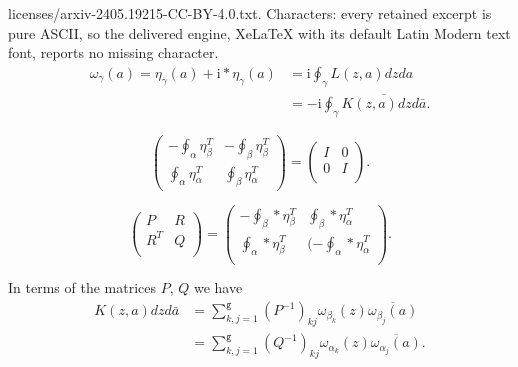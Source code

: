 \documentclass[10pt,a4paper]{amsart}
\def\I{\mathrm{i}}
\begin{document}
licenses/arxiv-2405.19215-CC-BY-4.0.txt. Characters: every retained excerpt is pure ASCII, so the delivered engine, XeLaTeX with its default Latin Modern text font, reports no missing character.
\begin{align}\label{omegaeta}
\omega_\gamma(a)=\eta_\gamma(a)+\I*\eta_\gamma(a)
&=\I \oint_\gamma L(z,a)dzda\\ 
&=-\I \oint_\gamma \overline{K(z,a)dzd\bar{a}}.
\end{align}

\begin{equation}\label{periods}
\left( \begin{array}{cc}
-\oint_{\alpha} \eta_{\beta}^T& -\oint_{\beta} \eta_{\beta}^T\\
\oint_{\alpha} \eta_{\alpha}^T & \oint_{\beta} \eta_{\alpha}^T 
\end{array} \right)
=\left( \begin{array}{cc}
                                            I & 0  \\
                                             0 & I  \\
\end{array} \right).
\end{equation}

\begin{equation}\label{PRRQ}
\left( \begin{array}{cc}
                                            P & R  \\
                                              R^T & Q  \\
\end{array} \right)=
\left( \begin{array}{cc} 
                                             - \oint_{\beta}*\eta_{\beta}^T & \oint_{\beta}*\eta_{\alpha}^T  \\
                                               \oint_{\alpha}*\eta_{\beta}^T & ( -\oint_{\alpha}*\eta_{\alpha}^T  \\
\end{array} \right).
\end{equation}

\begin{proposition}\label{prop:GUU} 
In terms of the matrices $P$, $Q$ we have 
\begin{align}\label{KPQ} 
K(z,a)dzd\bar{a}
&=\sum_{k,j=1}^\texttt{g} (P^{-1})_{kj}\omega_{\beta_k}(z)\overline{\omega_{\beta_j}(a)}\\
&=\sum_{k,j=1}^\texttt{g} (Q^{-1})_{kj}\omega_{\alpha_k}(z)\overline{\omega_{\alpha_j}(a)}.
\end{align}
\end{proposition}
\end{document}
